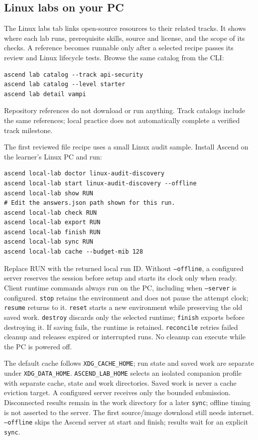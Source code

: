 \subsection{Linux labs on your PC}
The Linux labs tab links open-source resources to their related tracks. It shows
where each lab runs, prerequisite skills, source and license, and the scope of
its checks. A reference becomes runnable only after a selected recipe passes its
review and Linux lifecycle tests. Browse the same catalog from the CLI:
\begin{verbatim}
ascend lab catalog --track api-security
ascend lab catalog --level starter
ascend lab detail vampi
\end{verbatim}
Repository references do not download or run anything. Track catalogs include
the same references; local practice does not automatically complete a verified
track milestone.

The first reviewed file recipe uses a small Linux audit sample. Install Ascend
on the learner's Linux PC and run:
\begin{verbatim}
ascend local-lab doctor linux-audit-discovery
ascend local-lab start linux-audit-discovery --offline
ascend local-lab show RUN
# Edit the answers.json path shown for this run.
ascend local-lab check RUN
ascend local-lab export RUN
ascend local-lab finish RUN
ascend local-lab sync RUN
ascend local-lab cache --budget-mib 128
\end{verbatim}
Replace RUN with the returned local run ID. Without \texttt{--offline}, a configured
server reserves the session before setup and starts its clock only when ready.
Client runtime commands always run on the PC, including when \texttt{--server}
is configured. \texttt{stop} retains the environment and does not pause the
attempt clock; \texttt{resume} returns to it. \texttt{reset} starts a new environment
while preserving the old saved work. \texttt{destroy} discards only the selected
runtime; \texttt{finish} exports before destroying it. If saving fails, the runtime
is retained. \texttt{reconcile} retries failed cleanup and releases expired or
interrupted runs. No cleanup can execute while the PC is powered off.

The default cache follows \texttt{XDG\_CACHE\_HOME}; run state and saved work are
separate under \texttt{XDG\_DATA\_HOME}. \texttt{ASCEND\_LAB\_HOME} selects an isolated
companion profile with separate cache, state and work directories. Saved work is
never a cache eviction target. A configured server receives only the bounded
submission. Disconnected results remain in the work directory for a later
\texttt{sync}; offline timing is not asserted to the server.
The first source/image download still needs internet. \texttt{--offline} skips
the Ascend server at start and finish; results wait for an explicit \texttt{sync}.

